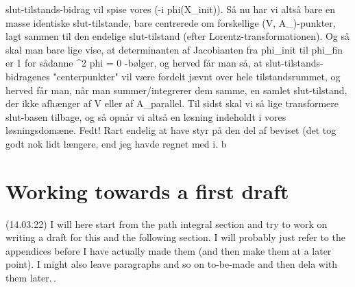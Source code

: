 \documentclass{report}
\begin{document}
slut-tilstands-bidrag vil spise vores \exp(-i phi(X_{init})). Så nu har vi altså bare en masse identiske slut-tilstande, bare centrerede om forskellige (V, A_\parallel)-punkter, lagt sammen til den endelige slut-tilstand (efter Lorentz-transformationen). Og så skal man bare lige vise, at determinanten af Jacobianten fra phi_{init} til phi_{fin} er 1 for sådanne \square^2 phi = 0 -bølger, og herved får man så, at slut-tilstands-bidragenes "centerpunkter" vil være fordelt jævnt over hele tilstandsrummet, og herved får man, når man summer/integrerer dem samme, en samlet slut-tilstand, der ikke afhænger af V eller af A_parallel. Til sidst skal vi så lige transformere slut-basen tilbage, og så opnår vi altså en løsning indeholdt i vores løsningsdomæne. Fedt! Rart endelig at have styr på den del af beviset (det tog godt nok lidt længere, end jeg havde regnet med ^^). ^^" 
%


\section{Working towards a first draft}
(14.03.22) I will here start from the path integral section and try to work on writing a draft for this and the following section. I will probably just refer to the appendices before I have actually made them (and then make them at a later point). I might also leave paragraphs and so on to-be-made and then dela with them later.\,. 
\end{document}
